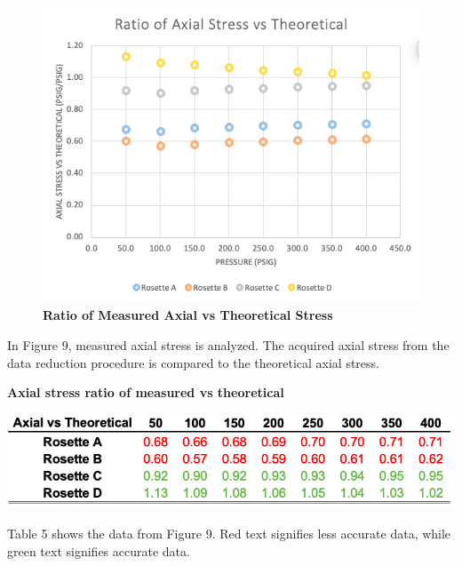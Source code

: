 \documentclass[12pt]{article}
\begin{document}
\begin{figure} [H]
	\centering
	\includegraphics [width=1.0\textwidth]{plot_axialvstheor}
	\caption{ \textbf{Ratio of Measured Axial vs Theoretical Stress}}
\end{figure} 
In Figure 9, measured axial stress is analyzed. The acquired axial stress from the data reduction procedure is compared to the theoretical axial stress.

\begin{table}[H]
  \caption{\textbf{Axial stress ratio of measured vs theoretical}}
  \includegraphics[width=\linewidth]{table_axial_theory}
  \centering
\end{table}
Table 5 shows the data from Figure 9. Red text signifies less accurate data, while green text signifies accurate data. 
\end{document}

